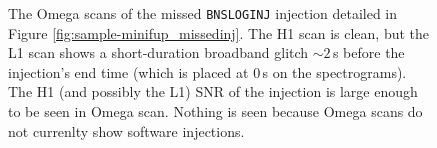 \begin{figure}[p]
\center
{}
\label{fig:sample-omega_missedinj}
\caption{The Omega scans of the missed \texttt{BNSLOGINJ} injection detailed in Figure \ref{fig:sample-minifup_missedinj}. The H1 scan is clean, but the L1 scan shows a short-duration broadband glitch $\sim2\,$s before the injection's end time (which is placed at $0\,$s on the spectrograms). The H1 (and possibly the L1) \ac{SNR} of the injection is large enough to be seen in Omega scan. Nothing is seen because Omega scans do not currenlty show software injections.}
\end{figure}

